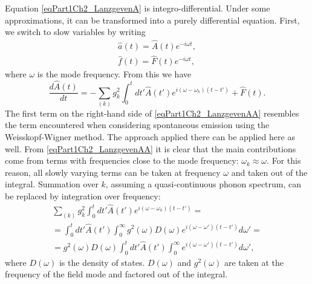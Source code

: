 Equation \eqref{eqPart1Ch2_LanzgevenA} is integro-differential. Under some approximations, it can be transformed into a purely differential equation. First, we switch to slow variables by writing
\begin{eqnarray}
\hat{a}\left(t\right) = \hat{A}\left(t\right)e^{-i \omega t},
\nonumber \\
\hat{f}\left(t\right) = \hat{F}\left(t\right)e^{-i \omega t},
\nonumber
\end{eqnarray}
where $\omega$ is the mode frequency. From this we have
\begin{equation}
\frac{d \hat{A}\left(t\right)}{dt} = 
- \sum_{(k)} g_k^2 \int_0^t
d t'  \hat{A}\left(t'\right)e^{i \left(\omega -
  \omega_k\right)\left(t - t'\right)} 
+ \hat{F}\left(t\right).
\label{eqPart1Ch2_LanzgevenAA}
\end{equation}
The first term on the right-hand side of \eqref{eqPart1Ch2_LanzgevenAA} resembles the term encountered when considering spontaneous emission using the Weisskopf-Wigner method. The approach applied there can be applied here as well. From \eqref{eqPart1Ch2_LanzgevenAA} it is clear that the main contributions come from terms with frequencies close to the mode frequency: $\omega_k \approx \omega$. For this reason, all slowly varying terms can be taken at frequency $\omega$ and taken out of the integral. Summation over $k$, assuming a quasi-continuous phonon spectrum, can be replaced by integration over frequency:
\begin{eqnarray}
\sum_{(k)}g_k^2\int_0^t d t' \hat{A}\left(t'\right) e^{i\left(\omega -
  \omega_k\right)\left(t - t'\right)} = 
\nonumber \\
=
\int_0^t d t'
  \hat{A}\left(t'\right)\int_0^{\infty}g^2\left(\omega\right) 
D\left(\omega\right) e^{i\left(\omega -
  \omega'\right)\left(t - t'\right)} d \omega' = 
\nonumber \\
= g^2\left(\omega\right) 
D\left(\omega\right)
\int_0^t d t'
  \hat{A}\left(t'\right)
\int_0^{\infty}e^{i\left(\omega -
  \omega'\right)\left(t - t'\right)} d \omega',
\nonumber
\end{eqnarray}
where $D\left(\omega\right)$ is the density of states.
$D\left(\omega\right)$ and $g^2\left(\omega\right)$ are taken at the frequency of the field mode and factored out of the integral.

